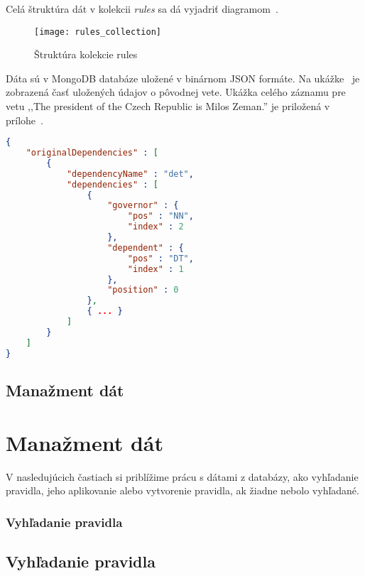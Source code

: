 Celá štruktúra dát v kolekcii \textit{rules} sa dá vyjadriť diagramom~.

\begin{figure}[H]
	\begin{center}\texttt{[image: rules\_collection]}\end{center}
	\caption[Štruktúra kolekcie rules]{Štruktúra kolekcie rules}\label{fig:rules_collection_structure}
\end{figure}

Dáta sú v MongoDB databáze uložené v binárnom JSON formáte. Na ukážke~ je zobrazená časť uložených údajov o pôvodnej vete. Ukážka celého záznamu pre vetu ,,The president of the Czech Republic is Milos Zeman.'' je priložená v prílohe~.
\\
\begin{lstlisting}[language = json, caption={Ukážka dát kolekcie rules}, label = {code:collection_rules_data_example}]
{  
	"originalDependencies" : [  
		{  
			"dependencyName" : "det",
			"dependencies" : [  
				{  
					"governor" : {  
						"pos" : "NN",
						"index" : 2
					},
					"dependent" : {  
						"pos" : "DT",
						"index" : 1
					},
					"position" : 0
				},
				{ ... }
			]
		}
	]
}
\end{lstlisting}


%
%
{
	\subsection{Manažment dát}
}
{
	\section{Manažment dát}
}
\label{subsection:data_management}
V nasledujúcich častiach si priblížime prácu s dátami z databázy, ako vyhľadanie pravidla, jeho aplikovanie alebo vytvorenie pravidla, ak žiadne nebolo vyhľadané.

%
%
{
	\subsubsection{Vyhľadanie pravidla}
}
{
	\subsection{Vyhľadanie pravidla}
}

